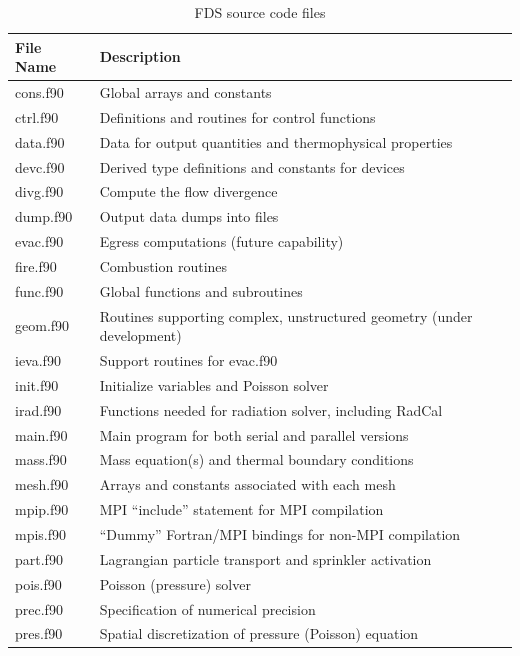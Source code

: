 \documentclass[11pt]{book}
\begin{document}
\begin{table}[ht]
\begin{center}
\caption{FDS source code files}
\label{tab:sourcefiles}
\vspace{.1in}
\begin{tabular}{|l|l|}
\hline
File Name  & Description  \\ \hline \hline
cons.f90   & Global arrays and constants \\ \hline
ctrl.f90   & Definitions and routines for control functions \\ \hline
data.f90   & Data for output quantities and thermophysical properties\\ \hline
devc.f90   & Derived type definitions and constants for devices \\ \hline
divg.f90   & Compute the flow divergence \\ \hline
dump.f90   & Output data dumps into files \\ \hline
evac.f90   & Egress computations (future capability) \\ \hline
fire.f90   & Combustion routines \\ \hline
func.f90   & Global functions and subroutines \\ \hline
geom.f90   & Routines supporting complex, unstructured geometry (under development) \\ \hline
ieva.f90   & Support routines for evac.f90 \\ \hline
init.f90   & Initialize variables and Poisson solver \\ \hline
irad.f90   & Functions needed for radiation solver, including RadCal \\ \hline
main.f90   & Main program for both serial and parallel versions \\ \hline
mass.f90   & Mass equation(s) and thermal boundary conditions \\ \hline
mesh.f90   & Arrays and constants associated with each mesh \\ \hline
mpip.f90   & MPI ``include'' statement for MPI compilation \\ \hline
mpis.f90   & ``Dummy'' Fortran/MPI bindings for non-MPI compilation \\ \hline
part.f90   & Lagrangian particle transport and sprinkler activation \\ \hline
pois.f90   & Poisson (pressure) solver \\ \hline
prec.f90   & Specification of numerical precision \\ \hline
pres.f90   & Spatial discretization of pressure (Poisson) equation \\ \hline

\end{tabular}
\end{center}
\end{table}
\end{document}
